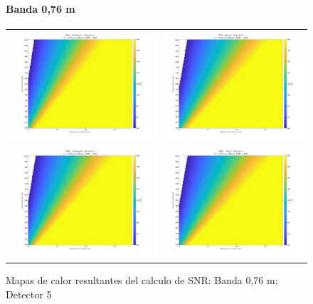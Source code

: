 \begin{landscape}
\begin{figure}[p]
\centering
\setlength{\tabcolsep}{2pt}
\renewcommand{\arraystretch}{0}

\paragraph{Banda 0,76 \textmu m}
\begin{tabular}{cc}
\includegraphics[width=0.48\linewidth]{4.Payload/SNR/SNR_Lambda3_Detector5_Telescopio1_heatmap.jpg} &
\includegraphics[width=0.48\linewidth]{4.Payload/SNR/SNR_Lambda3_Detector5_Telescopio2_heatmap.jpg} \\
\includegraphics[width=0.48\linewidth]{4.Payload/SNR/SNR_Lambda3_Detector5_Telescopio3_heatmap.jpg} &
\includegraphics[width=0.48\linewidth]{4.Payload/SNR/SNR_Lambda3_Detector5_Telescopio4_heatmap.jpg} \\
\end{tabular}
\caption{Mapas de calor resultantes del calculo de SNR: Banda 0,76 \textmu m; Detector 5}
\end{figure}
\end{landscape}


